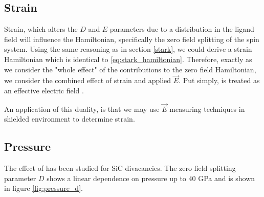 \subsection{Strain}
Strain, which alters the $D$ and $E$ parameters due to a distribution in the ligand field \cite{Jeschke} will influence the Hamiltonian, specifically the zero field splitting of the spin system. Using the same reasoning as
in section \ref{stark}, we could derive a strain Hamiltonian which is identical to \eqref{eq:stark_hamiltonian}.
Therefore, exactly as we consider the "whole effect" of the contributions to the zero field Hamiltonian, we consider
the combined effect of strain and applied $\vec{E}$. Put simply,  is treated as an effective electric
field \cite{PhysRevLett.112.187601}.

An application of this duality, is that we may use $\vec{E}$ measuring techniques in shielded environment to determine strain.



\subsection{Pressure}
The effect of  has been studied for SiC divacancies. The zero field splitting parameter $D$ shows 
a linear dependence on pressure up to $40$ GPa \cite{doi:10.1021/acs.nanolett.2c03378} and is shown in figure \ref{fig:pressure_d}. 

